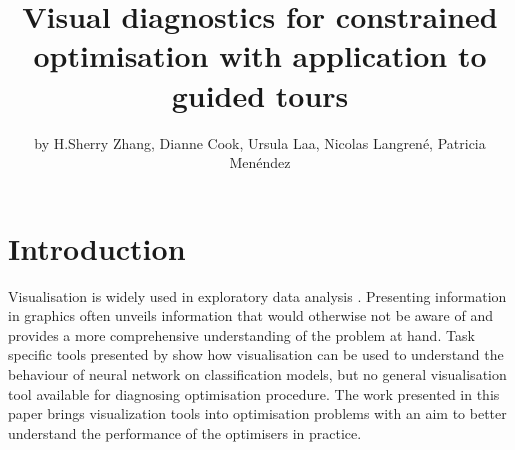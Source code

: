 \title{Visual diagnostics for constrained optimisation with application to
guided tours}
\author{by H.Sherry Zhang, Dianne Cook, Ursula Laa, Nicolas Langrené, Patricia Menéndez}

\maketitle


\hypertarget{introduction}{%
\section{Introduction}\label{introduction}}

Visualisation is widely used in exploratory data analysis
\citep{tukey1977exploratory, unwin2015graphical, healy2018data, wilke2019fundamentals}.
Presenting information in graphics often unveils information that would
otherwise not be aware of and provides a more comprehensive
understanding of the problem at hand. Task specific tools presented by
\citet{li2020visualizing} show how visualisation can be used to
understand the behaviour of neural network on classification models, but
no general visualisation tool available for diagnosing optimisation
procedure. The work presented in this paper brings visualization tools
into optimisation problems with an aim to better understand the
performance of the optimisers in practice.

